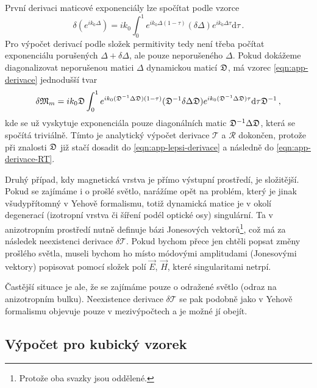 První derivaci maticové exponenciály lze spočítat podle vzorce\cite{najfeldDerivativesMatrixExponential1995a}
\begin{equation}
    \label{eqn:app-derivace}
    \delta(e^{ik_0\Delta}) = ik_0\int_0^1 e^{ik_0\Delta(1-\tau)} (\delta\Delta) e^{ik_0\Delta \tau} \textrm{d}\tau \,.
\end{equation}
Pro výpočet derivací podle složek permitivity tedy není třeba počítat exponenciálu porušených $\Delta+\delta\Delta$, ale pouze neporušeného $\Delta$.
Pokud dokážeme diagonalizovat neporušenou matici $\Delta$ dynamickou maticí $\mathfrak{D}$, má vzorec \eqref{eqn:app-derivace} jednodušší tvar
\begin{equation}
    \label{eqn:app-lepsi-derivace}
    \delta\mathfrak{M}_m = ik_0 \mathfrak{D} \int_0^1 e^{ik_0 (\mathfrak{D}^{-1}\Delta\mathfrak{D})(1-\tau)} (\mathfrak{D}^{-1}\delta\Delta\mathfrak{D}) e^{ik_0(\mathfrak{D}^{-1}\Delta\mathfrak{D})\tau} \textrm{d}\tau \mathfrak{D}^{-1}\,,
\end{equation}
kde se už vyskytuje exponenciála pouze diagonálních matic $\mathfrak{D}^{-1}\Delta\mathfrak{D}$, která se spočítá triviálně.
Tímto je analytický výpočet derivace $\mathcal{T}$ a $\mathcal{R}$ dokončen, protože při znalosti $\mathfrak{D}$ již stačí dosadit do \eqref{eqn:app-lepsi-derivace} a následně do \eqref{eqn:app-derivace-RT}.

Druhý případ, kdy magnetická vrstva je přímo výstupní prostředí, je složitější.
Pokud se zajímáme i o prošlé světlo, narážíme opět na problém, který je jinak všudypřítomný v Yehově formalismu, totiž dynamická matice je v okolí degenerací (izotropní vrstva či šíření podél optické osy) singulární.
Ta v anizotropním prostředí nutně definuje bázi Jonesových vektorů\footnote{Protože oba svazky jsou oddělené.}, což má za následek neexistenci derivace $\delta\mathcal{T}$.
Pokud bychom přece jen chtěli popsat změny prošlého světla, museli bychom ho místo módovými amplitudami (Jonesovými vektory) popisovat pomocí složek polí $\vec{E}$, $\vec{H}$, které singularitami netrpí.

Častější situace je ale, že se zajímáme pouze o odražené světlo (odraz na anizotropním bulku).
Neexistence derivace $\delta\mathcal{T}$ se pak podobně jako v Yehově formalismu objevuje pouze v mezivýpočtech a je možné jí obejít.



\subsection*{Výpočet pro kubický vzorek}


